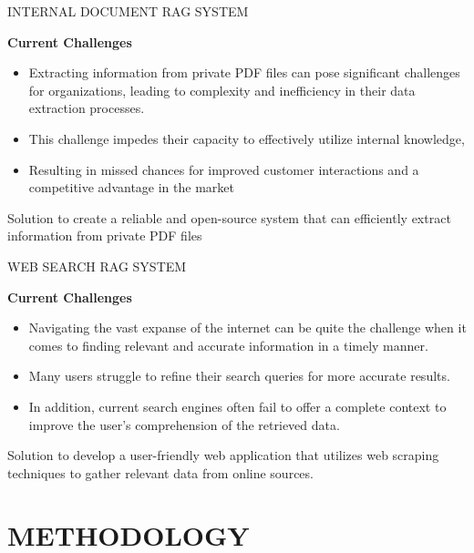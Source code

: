 \documentclass{beamer}
\begin{document}
\begin{frame}{INTERNAL DOCUMENT RAG SYSTEM}

\textbf{Current Challenges}
    \begin{itemize}
        \item Extracting information from private PDF files can pose significant challenges for organizations,
        leading to complexity and inefficiency in their data extraction processes.
        \item This challenge impedes their capacity to effectively utilize internal knowledge,
        \item Resulting in missed chances for improved customer interactions and a competitive advantage in the market
    \end{itemize}   
\begin{block}{Solution}
to create a reliable and open-source system that can efficiently extract information from private PDF files \end{block}

\end{frame}

\begin{frame}{WEB SEARCH RAG SYSTEM}

\textbf{Current Challenges}
 
    \begin{itemize}
        \item Navigating the vast expanse of the internet can be quite the challenge when it comes to finding relevant and accurate information in a timely manner.
        \item Many users struggle to refine their search queries for more accurate results. 
        \item In addition, current search engines often fail to offer a complete context to improve the user's comprehension of the retrieved data.
    \end{itemize}   
\begin{block}{Solution}
to develop a user-friendly web application that utilizes web scraping techniques to gather relevant data from online sources.
\end{block}

\end{frame}







\section{METHODOLOGY}
\end{document}

